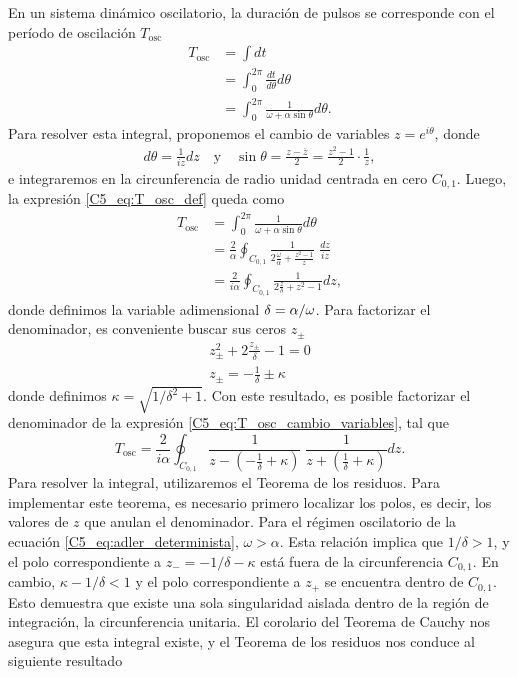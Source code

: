 \documentclass[./main.tex]{subfiles}
\begin{document}
En un sistema dinámico oscilatorio, la duración de pulsos se corresponde con el período de oscilación $T_{\text{osc}}$ 
\begin{align}
    T_{\text{osc}}&= \int dt \nonumber \\ 
    &= \int_{0}^{2 \pi} \frac{dt}{d\theta} d\theta \nonumber \\
    &= \int_{0}^{2 \pi} \frac{1}{\omega + \alpha \sin{\theta}} d\theta.
    \label{C5_eq:T_osc_def}
\end{align}
Para resolver esta integral, proponemos el cambio de variables $z = e^{i \theta}$, donde 
\begin{align}
    d\theta = \frac{1}{iz} dz \quad \text{y} \quad \sin{\theta} = \frac{z - \overline{z}}{2} = \frac{z^{2} - 1}{2} \cdot \frac{1}{z},
\end{align}
e integraremos en la circunferencia de radio unidad centrada en cero $C_{0,1}$. Luego, la expresión \ref{C5_eq:T_osc_def} queda como
\begin{align}
    T_{\text{osc}}&= \int_{0}^{2 \pi} \frac{1}{\omega + \alpha \sin{\theta}} d\theta \nonumber \\
    &= \frac{2}{\alpha} \oint_{C_{0,1}} \frac{1}{2 \frac{\omega}{\alpha} + \frac{z^{2} - 1}{z}} \; \frac{dz}{iz} \nonumber\\
    &= \frac{2}{i \alpha} \oint_{C_{0,1}} \frac{1}{2 \frac{z}{\delta} + z^{2}-1}dz,
    \label{C5_eq:T_osc_cambio_variables}
\end{align}
 donde definimos la variable adimensional $\delta = \alpha/\omega$. Para factorizar el denominador, es conveniente buscar sus ceros $z_\pm$
\begin{align}
    z_\pm^{2} + 2 \frac{z_\pm}{\delta} - 1=0 \nonumber\\
    z_\pm = -\frac{1}{\delta}  \pm \kappa
\end{align}
donde definimos $\kappa = \sqrt{1/\delta^{2} + 1}$. Con este resultado, es posible factorizar el denominador de la expresión \ref{C5_eq:T_osc_cambio_variables}, tal que 
\begin{equation}
    T_{\text{osc}}= \frac{2}{i \alpha} \oint_{C_{0,1}} \frac{1}{z-( -\frac{1}{\delta} + \kappa)} \; \frac{1}{z + (\frac{1}{\delta} + \kappa)} dz.
    \label{C5_eq:T_osc_factorizada}
\end{equation}
Para resolver la integral, utilizaremos el Teorema de los residuos. Para implementar este teorema, es necesario primero localizar los polos, es decir, los valores de $z$ que anulan el denominador. Para el régimen oscilatorio de la ecuación \ref{C5_eq:adler_determinista}, $\omega > \alpha $. Esta relación implica que $1/\delta >1$, y el polo correspondiente a $z_- = -1/\delta  - \kappa $ está fuera de la circunferencia $C_{0,1}$. En cambio, $\kappa - 1/\delta < 1 $ y el polo correspondiente a $z_+$ se encuentra dentro de $C_{0,1}$. Esto demuestra que existe una sola singularidad aislada dentro de la región de integración, la circunferencia unitaria. El corolario del Teorema de Cauchy nos asegura que esta integral existe, y el Teorema de los residuos nos conduce al siguiente resultado \cite{Strogatz1994}
\end{document}
